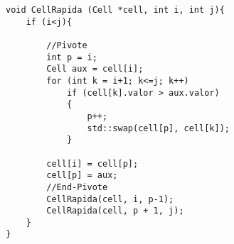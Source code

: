 \begin{lstlisting}
void CellRapida (Cell *cell, int i, int j){
    if (i<j){

        //Pivote
        int p = i; 
        Cell aux = cell[i];
	    for (int k = i+1; k<=j; k++)
		    if (cell[k].valor > aux.valor)
            {
			    p++;
			    std::swap(cell[p], cell[k]);	
		    }
	    
        cell[i] = cell[p];
	    cell[p] = aux;
        //End-Pivote
        CellRapida(cell, i, p-1);
        CellRapida(cell, p + 1, j);
    }
}
\end{lstlisting}
